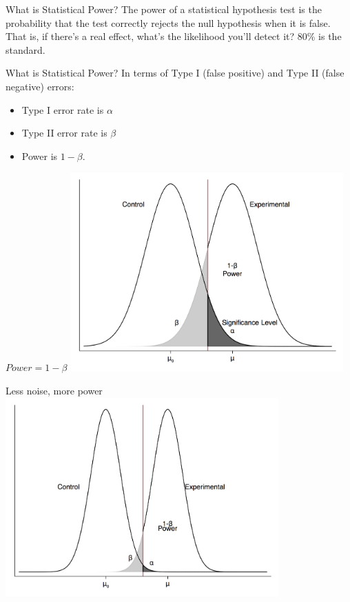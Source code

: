 \documentclass{beamer}
\begin{document}
\begin{frame}{What is Statistical Power?}
The power of a statistical hypothesis test is the probability that the test correctly rejects the null hypothesis when it is false.
\vskip0.25in
That is, if there's a real effect, what's the likelihood you'll detect it? 80\% is the standard.
\end{frame}

\begin{frame}{What is Statistical Power?}
In terms of Type I (false positive) and Type II (false negative) errors: 
\begin{itemize}
\item Type I error rate is $\alpha$
\item Type II error rate is $\beta$
\item Power is $1-\beta$.
\end{itemize}
 \end{frame}

\begin{frame}{$Power=1-\beta$}
\includegraphics[height=3in]{../Images/powerfig1.png}
\end{frame}

\begin{frame}{Less noise, more power}
\includegraphics[height=3in]{../Images/powerfig2.png}
\end{frame}
\end{document}
